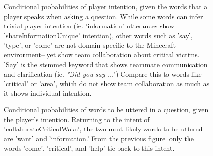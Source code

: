     
\begin{figure}[h!]
    \centering
    \caption{%
        Conditional probabilities of player intention, given the words that a
        player speaks when asking a question. While some words can infer
        trivial player intention (ie. 'information' utterances show
        'shareInformationUnique' intention), other words such as 'say', 'type',
        or 'come' are not domain-specific to the Minecraft environment-- yet
        show team collaboration about critical victims. 'Say' is the stemmed
        keyword that shows teammate communication and clarification (ie.
        \emph{"Did you say} ...") Compare this to words like 'critical' or
        'area', which do not show team collaboration as much as it shows
        individual intention. 
    }
    \end{figure}

\begin{figure}[h!]
    \centering
    \caption{%
        Conditional probabilities of words to be uttered in a question, given
        the player's intention. Returning to the intent of
        'collaborateCriticalWake', the two most likely words to be uttered are
        'want' and 'information.' From the previous figure, only the words
        'come', 'critical', and 'help' tie back to this intent.
    }
\end{figure}
